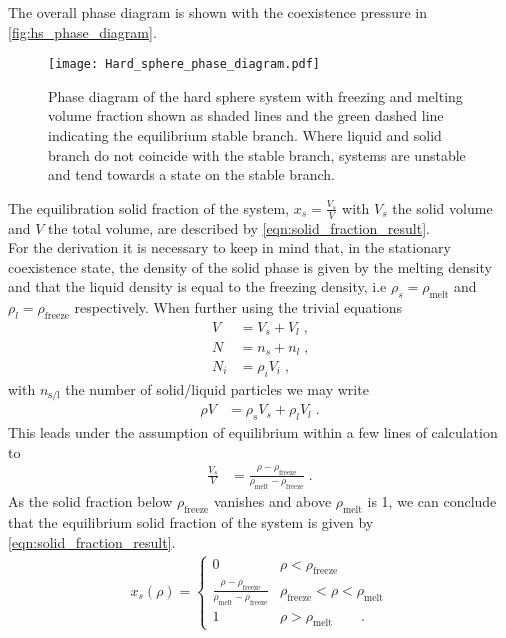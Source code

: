 The overall phase diagram is shown with the coexistence pressure in \autoref{fig:hs_phase_diagram}.\\
\begin{figure}[h]
\centering
\texttt{[image: Hard\_sphere\_phase\_diagram.pdf]}
\caption[Phase diagram of hard sphere fluid]{Phase diagram of the hard sphere system with freezing and melting volume fraction shown as shaded lines and the green dashed line indicating the equilibrium stable branch. Where liquid and solid branch do not coincide with the stable branch, systems are unstable and tend towards a state on the stable branch.}
\label{fig:hs_phase_diagram}
\end{figure}
The equilibration solid fraction of the system, $x_s = \frac{V_s}{V}$ with $V_s$ the solid volume and $V$ the total volume, are described by \autoref{eqn:solid_fraction_result}.\\ 
For the derivation it is necessary to keep in mind that, in the stationary coexistence state, the density of the solid phase is given by the melting density and that the liquid density is equal to the freezing density, i.e $\rho_s = \rho_{\text{melt}}$ and $\rho_l = \rho_{\text{freeze}}$ respectively. When further using the trivial equations
\begin{align}
V &= V_s + V_l \; \text{,} \nonumber\\
N &= n_s + n_l \; \text{,} \nonumber\\
N_i &= \rho_i V_i \; \text{,} 
\end{align}
with $n_{\text{s/l}}$ the number of solid/liquid particles we may write
\begin{align}
\rho V &= \rho_s V_s + \rho_l V_l \; \text{.}
\end{align}
This leads under the assumption of equilibrium within a few lines of calculation to 
\begin{align}
\frac{V_s}{V} &= \frac{\rho - \rho_{\text{freeze}}}{\rho_{\text{melt}} - \rho_{\text{freeze}} } \; \text{.}
\end{align}
As the solid fraction below $\rho_{\text{freeze}} $ vanishes and above $\rho_{\text{melt}}$ is 1, we can conclude that the equilibrium solid fraction of the system is given by \autoref{eqn:solid_fraction_result}.
\begin{align}
\label{eqn:solid_fraction_result}
x_s(\rho) = 
\begin{cases}
0 & \rho <  \rho_{\text{freeze}}\\
\frac{\rho-\rho_{\text{freeze}}}{\rho_{\text{melt}}-\rho_{\text{freeze}}} &  \rho_{\text{freeze}} < \rho <  \rho_{\text{melt}}\\ 
1 &  \rho > \rho_{\text{melt}} \quad \quad \text{.}
\end{cases}
\end{align}

